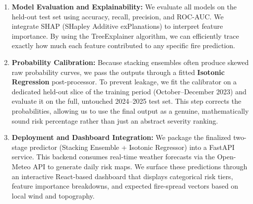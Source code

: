 \begin{enumerate}
    \item \textbf{Model Evaluation and Explainability:} We evaluate all models on the held-out test set using accuracy, recall, precision, and ROC-AUC. We integrate SHAP (SHapley Additive exPlanations) to interpret feature importance. By using the TreeExplainer algorithm, we can efficiently trace exactly how much each feature contributed to any specific fire prediction.
    
    \item \textbf{Probability Calibration:} Because stacking ensembles often produce skewed raw probability curves, we pass the outputs through a fitted \textbf{Isotonic Regression} post-processor. To prevent leakage, we fit the calibrator on a dedicated held-out slice of the training period (October--December 2023) and evaluate it on the full, untouched 2024--2025 test set. This step corrects the probabilities, allowing us to use the final output as a genuine, mathematically sound risk percentage rather than just an abstract severity ranking.
    
    \item \textbf{Deployment and Dashboard Integration:} We package the finalized two-stage predictor (Stacking Ensemble + Isotonic Regressor) into a FastAPI service. This backend consumes real-time weather forecasts via the Open-Meteo API to generate daily risk maps. We surface these predictions through an interactive React-based dashboard that displays categorical risk tiers, feature importance breakdowns, and expected fire-spread vectors based on local wind and topography.
\end{enumerate}

